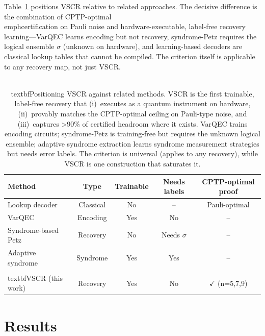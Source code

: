 \documentclass[aps,prxquantum,reprint,superscriptaddress]{revtex4-2}
\begin{document}
Table~\ref{tab:comparison} positions VSCR relative to related approaches. The
decisive difference is the combination of CPTP-optimal \\emph{certification} on
Pauli noise and hardware-executable, label-free recovery learning---VarQEC learns
encoding but not recovery, syndrome-Petz requires the logical ensemble $\sigma$
(unknown on hardware), and learning-based decoders are classical lookup tables that
cannot be compiled. The criterion itself is applicable to any recovery map, not just
VSCR.

\begin{table}[h]
\centering
\small
\begin{tabular}{l c c c c}
\hline
Method & Type & Trainable & Needs labels & CPTP-optimal proof \\
\hline
Lookup decoder~\cite{knill_theory} & Classical & No & -- & Pauli-optimal \\
VarQEC~\cite{varqec_cao,varqec_meyer} & Encoding & Yes & No & -- \\
Syndrome-based Petz~\cite{biswas_petz} & Recovery & No & Needs $\sigma$ & -- \\
Adaptive syndrome~\cite{berthusen_ase} & Syndrome & Yes & Yes & -- \\
\\textbf{VSCR (this work)} & Recovery & Yes & No & $\checkmark$ (n=5,7,9) \\
\hline
\end{tabular}
\caption{\\textbf{Positioning VSCR against related methods.} VSCR is the first
trainable, label-free recovery that (i)~executes as a quantum instrument on hardware,
(ii)~provably matches the CPTP-optimal ceiling on Pauli-type noise, and (iii)~captures
>90\% of certified headroom where it exists. VarQEC trains encoding circuits; syndrome-Petz
is training-free but requires the unknown logical ensemble; adaptive syndrome extraction
learns syndrome measurement strategies but needs error labels. The criterion is universal
(applies to any recovery), while VSCR is one construction that saturates it.}
\label{tab:comparison}
\end{table}

\section*{Results}
\end{document}
